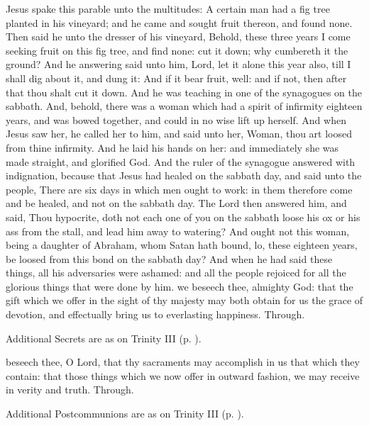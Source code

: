  Jesus spake this parable unto the multitudes: A certain man had a fig tree planted in his vineyard; and he came and sought fruit thereon, and found none. Then said he unto the dresser of his vineyard, Behold, these three years I come seeking fruit on this fig tree, and find none: cut it down; why cumbereth it the ground? And he answering said unto him, Lord, let it alone this year also, till I shall dig about it, and dung it: And if it bear fruit, well: and if not, then after that thou shalt cut it down. And he was teaching in one of the synagogues on the sabbath. And, behold, there was a woman which had a spirit of infirmity eighteen years, and was bowed together, and could in no wise lift up herself. And when Jesus saw her, he called her to him, and said unto her, Woman, thou art loosed from thine infirmity. And he laid his hands on her: and immediately she was made straight, and glorified God. And the ruler of the synagogue answered with indignation, because that Jesus had healed on the sabbath day, and said unto the people, There are six days in which men ought to work: in them therefore come and be healed, and not on the sabbath day. The Lord then answered him, and said, Thou hypocrite, doth not each one of you on the sabbath loose his ox or his ass from the stall, and lead him away to watering? And ought not this woman, being a daughter of Abraham, whom Satan hath bound, lo, these eighteen years, be loosed from this bond on the sabbath day? And when he had said these things, all his adversaries were ashamed: and all the people rejoiced for all the glorious things that were done by him.
\secret
{} we beseech thee, almighty God: that the gift which we offer in the sight of thy majesty may both obtain for us the grace of devotion, and effectually bring us to everlasting happiness. Through.
\begin{rubric}
    Additional Secrets are as on Trinity III (p. \pageref{TrinityIII}).
\end{rubric}
\clearpage
{}
\postcommunion
{} beseech thee, O Lord, that thy sacraments may accomplish in us that which they contain: that those things which we now offer in outward fashion, we may receive in verity and truth. Through.
\begin{rubric}
    Additional Postcommunions are as on Trinity III (p. \pageref{TrinityIII}).
\end{rubric}


